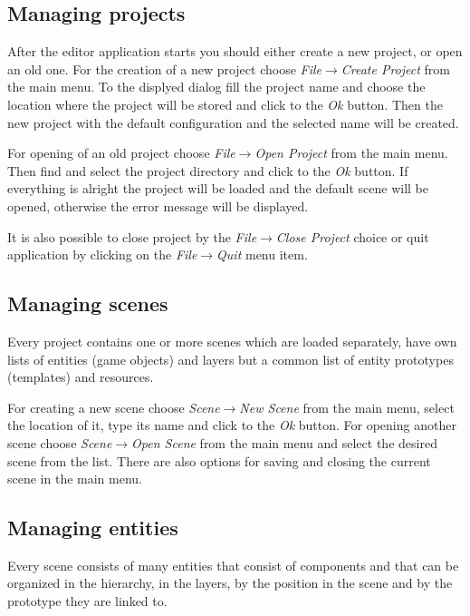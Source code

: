 \subsection{Managing projects}

After the editor application starts you should either create a new project, or open an old one. For the creation of a new project choose \emph{File}$\rightarrow$\emph{Create Project} from the main menu. To the displyed dialog fill the project name and choose the location where the project will be stored and click to the \emph{Ok} button. Then the new project with the default configuration and the selected name will be created.

For opening of an old project choose \emph{File}$\rightarrow$\emph{Open Project} from the main menu. Then find and select the project directory and click to the \emph{Ok} button. If everything is alright the project will be loaded and the default scene will be opened, otherwise the error message will be displayed.


It is also possible to close project by the \emph{File}$\rightarrow$\emph{Close Project} choice or quit application by clicking on the \emph{File}$\rightarrow$\emph{Quit} menu item.

\subsection{Managing scenes}

Every project contains one or more scenes which are loaded separately, have own lists of entities (game objects) and layers but a common list of entity prototypes (templates) and resources.

For creating a new scene choose \emph{Scene}$\rightarrow$\emph{New Scene} from the main menu, select the location of it, type its name and click to the \emph{Ok} button. For opening another scene choose \emph{Scene}$\rightarrow$\emph{Open Scene} from the main menu and select the desired scene from the list. There are also options for saving and closing the current scene in the main menu.

\subsection{Managing entities}

Every scene consists of many entities that consist of components and that can be organized in the hierarchy, in the layers, by the position in the scene and by the prototype they are linked to.

